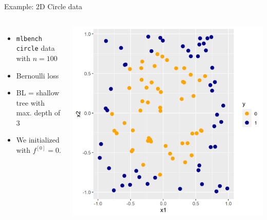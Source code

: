 \documentclass[11pt,compress,t,notes=noshow, xcolor=table]{beamer}
\begin{document}
\begin{frame2}{Example: 2D Circle data}


\begin{columns}
\column{5.5cm}
\begin{itemize}
\item \texttt{mlbench} \texttt{circle} data with $n = 100$ 
\item Bernoulli loss 
\item BL = shallow tree with max. depth of 3
\item We initialized with $f^{[0]} = 0.$
\end{itemize}
\column{4.5cm}
\begin{center}
\includegraphics[width=\textwidth]{figure/boosting_classif_example.png}
\end{center}

\end{columns}



\end{frame2}
\end{document}
